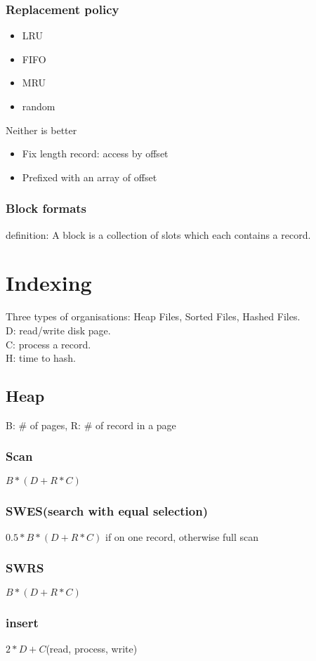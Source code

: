 \documentclass[a4paper]{scrartcl}
\begin{document}
    \subsubsection{Replacement policy}
      \begin{itemize}
        \item LRU
        \item FIFO
        \item MRU
        \item random
      \end{itemize}
      Neither is better
      \begin{itemize}
        \item Fix length record: access by offset
        \item Prefixed with an array of offset
      \end{itemize}
    \subsubsection{Block formats}
      definition: A block is a collection of slots which each contains a record.
\section{Indexing}
  Three types of organisations: Heap Files, Sorted Files, Hashed Files.\\
  D: read/write disk page.\\
  C: process a record.\\
  H: time to hash.\\
  \subsection{Heap}
    B: \# of pages, R: \# of record in a page
    \subsubsection{Scan}
      $B * (D + R * C)$
    \subsubsection{SWES(search with equal selection)}
      $0.5 * B * (D + R * C)$ if on one record, otherwise full scan
    \subsubsection{SWRS}
      $B * (D + R * C)$
    \subsubsection{insert}
      $2 * D + C$(read, process, write)
\end{document}
